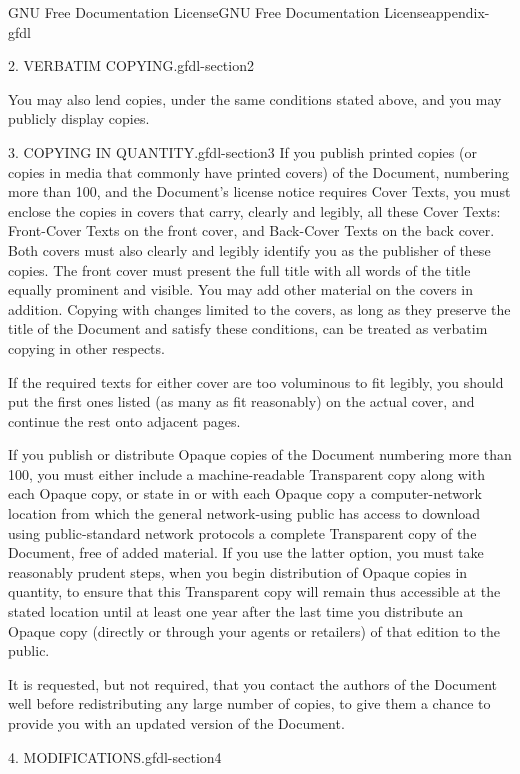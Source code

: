 \documentclass[oneside,10pt,]{book}
\numberwithin{equation}{section}
\begin{document}
\begin{appendixptx}{GNU Free Documentation License}{}{GNU Free Documentation License}{}{}{appendix-gfdl}
\begin{paragraphs}{2. VERBATIM COPYING.}{gfdl-section2}
\par
\hypertarget{p-717}{}%
You may also lend copies, under the same conditions stated above, and you may publicly display copies.%
\end{paragraphs}%
\begin{paragraphs}{3. COPYING IN QUANTITY.}{gfdl-section3}%
\hypertarget{p-718}{}%
If you publish printed copies (or copies in media that commonly have printed covers) of the Document, numbering more than 100, and the Document's license notice requires Cover Texts, you must enclose the copies in covers that carry, clearly and legibly, all these Cover Texts: Front-Cover Texts on the front cover, and Back-Cover Texts on the back cover. Both covers must also clearly and legibly identify you as the publisher of these copies. The front cover must present the full title with all words of the title equally prominent and visible. You may add other material on the covers in addition. Copying with changes limited to the covers, as long as they preserve the title of the Document and satisfy these conditions, can be treated as verbatim copying in other respects.%
\par
\hypertarget{p-719}{}%
If the required texts for either cover are too voluminous to fit legibly, you should put the first ones listed (as many as fit reasonably) on the actual cover, and continue the rest onto adjacent pages.%
\par
\hypertarget{p-720}{}%
If you publish or distribute Opaque copies of the Document numbering more than 100, you must either include a machine-readable Transparent copy along with each Opaque copy, or state in or with each Opaque copy a computer-network location from which the general network-using public has access to download using public-standard network protocols a complete Transparent copy of the Document, free of added material. If you use the latter option, you must take reasonably prudent steps, when you begin distribution of Opaque copies in quantity, to ensure that this Transparent copy will remain thus accessible at the stated location until at least one year after the last time you distribute an Opaque copy (directly or through your agents or retailers) of that edition to the public.%
\par
\hypertarget{p-721}{}%
It is requested, but not required, that you contact the authors of the Document well before redistributing any large number of copies, to give them a chance to provide you with an updated version of the Document.%
\end{paragraphs}%
\begin{paragraphs}{4. MODIFICATIONS.}{gfdl-section4}%

\end{paragraphs}
\end{appendixptx}
\end{document}
